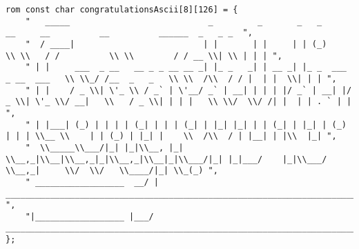 \begin{lstlisting}
rom const char congratulationsAscii[8][126] = {
	"   _____                            _         _       _   _                  __     __          __          ______  _   _ _  ",
	"  / ____|                          | |       | |     | | (_)                 \\ \\   / /          \\ \\        / / __ \\| \\ | | | ",
	" | |     ___  _ __   __ _ _ __ __ _| |_ _   _| | __ _| |_ _  ___  _ __  ___   \\ \\_/ /__  _   _   \\ \\  /\\  / / |  | |  \\| | | ",
	" | |    / _ \\| \'_ \\ / _` | \'__/ _` | __| | | | |/ _` | __| |/ _ \\| \'_ \\/ __|   \\   / _ \\| | | |   \\ \\/  \\/ /| |  | | . ` | | ",
	" | |___| (_) | | | | (_| | | | (_| | |_| |_| | | (_| | |_| | (_) | | | \\__ \\    | | (_) | |_| |    \\  /\\  / | |__| | |\\  |_| ",
	"  \\_____\\___/|_| |_|\\__, |_|  \\__,_|\\__|\\__,_|_|\\__,_|\\__|_|\\___/|_| |_|___/    |_|\\___/ \\__,_|     \\/  \\/   \\____/|_| \\_(_) ",
	" __________________  __/ | _________________________________________________________________________________________________ ",
	"|__________________ |___/ __________________________________________________________________________________________________|",
};


\end{lstlisting}
